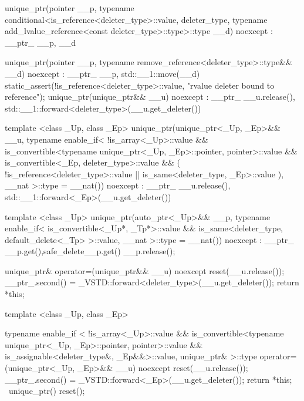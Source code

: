 \documentclass[ebook,11pt,article]{memoir}
\begin{document}
\begin{codeblock}
{{    unique_ptr(pointer __p, 
    typename conditional<is_reference<deleter_type>::value,
                         deleter_type,
                         typename add_lvalue_reference<const deleter_type>::type>::type __d)
             noexcept
    : __ptr_ {__p, __d} {}

     unique_ptr(pointer __p, typename remove_reference<deleter_type>::type&& __d)
             noexcept
    : __ptr_ {__p, std::__1::move(__d)}
        {
            static_assert(!is_reference<deleter_type>::value, "rvalue deleter bound to reference");
        }
     unique_ptr(unique_ptr&& __u) noexcept
    : __ptr_ {__u.release(), std::__1::forward<deleter_type>(__u.get_deleter())} {}
    
    template <class _Up, class _Ep>    
    unique_ptr(unique_ptr<_Up, _Ep>&& __u,
                   typename enable_if<
                     !is_array<_Up>::value &&
                      is_convertible<typename unique_ptr<_Up, _Ep>::pointer, pointer>::value &&
                      is_convertible<_Ep, deleter_type>::value &&
                      (
                       !is_reference<deleter_type>::value ||
                       is_same<deleter_type, _Ep>::value
                      ),
                      __nat
                      >::type = __nat()) noexcept
    : __ptr_ {__u.release(), std::__1::forward<_Ep>(__u.get_deleter())} {}

    template <class _Up>
         unique_ptr(auto_ptr<_Up>&& __p,
                typename enable_if<
                            is_convertible<_Up*, _Tp*>::value &&
                            is_same<deleter_type, default_delete<_Tp> >::value,
                           __nat
                        >::type = __nat()) noexcept
    : __ptr_ {__p.get(),safe_delete{__p.get()}}
            {__p.release();
            }

         unique_ptr& operator=(unique_ptr&& __u) noexcept
            {
                reset(__u.release());
                __ptr_.second() = _VSTD::forward<deleter_type>(__u.get_deleter());
                return *this;
            }

        template <class _Up, class _Ep>
            
            typename enable_if
            <
                !is_array<_Up>::value &&
                is_convertible<typename unique_ptr<_Up, _Ep>::pointer, pointer>::value &&
                is_assignable<deleter_type&, _Ep&&>::value,
                unique_ptr&
            >::type
            operator=(unique_ptr<_Up, _Ep>&& __u) noexcept
            {
                reset(__u.release());
                __ptr_.second() = _VSTD::forward<_Ep>(__u.get_deleter());
                return *this;
            }
     ~unique_ptr() {reset();}

}}
\end{codeblock}
\end{document}
